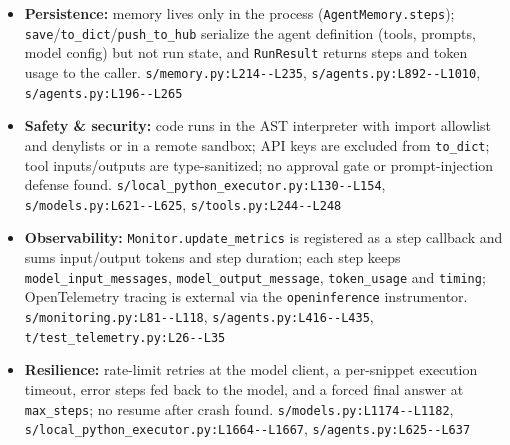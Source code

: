 \begin{itemize}
\item \textbf{Persistence:} memory lives only in the process (\texttt{AgentMemory.\allowbreak{}steps}); \texttt{save}/\texttt{to\_\allowbreak{}dict}/\texttt{push\_\allowbreak{}to\_\allowbreak{}hub} serialize the agent definition (tools, prompts, model config) but not run state, and \texttt{RunResult} returns steps and token usage to the caller. \texttt{s/\allowbreak{}memory.\allowbreak{}py:\allowbreak{}L214-\allowbreak{}-\allowbreak{}L235}, \texttt{s/\allowbreak{}agents.\allowbreak{}py:\allowbreak{}L892-\allowbreak{}-\allowbreak{}L1010}, \texttt{s/\allowbreak{}agents.\allowbreak{}py:\allowbreak{}L196-\allowbreak{}-\allowbreak{}L265}
\item \textbf{Safety \& security:} code runs in the AST interpreter with import allowlist and denylists or in a remote sandbox; API keys are excluded from \texttt{to\_\allowbreak{}dict}; tool inputs/outputs are type-sanitized; no approval gate or prompt-injection defense found. \texttt{s/\allowbreak{}local\_\allowbreak{}python\_\allowbreak{}executor.\allowbreak{}py:\allowbreak{}L130-\allowbreak{}-\allowbreak{}L154}, \texttt{s/\allowbreak{}models.\allowbreak{}py:\allowbreak{}L621-\allowbreak{}-\allowbreak{}L625}, \texttt{s/\allowbreak{}tools.\allowbreak{}py:\allowbreak{}L244-\allowbreak{}-\allowbreak{}L248}
\item \textbf{Observability:} \texttt{Monitor.\allowbreak{}update\_\allowbreak{}metrics} is registered as a step callback and sums input/output tokens and step duration; each step keeps \texttt{model\_\allowbreak{}input\_\allowbreak{}messages}, \texttt{model\_\allowbreak{}output\_\allowbreak{}message}, \texttt{token\_\allowbreak{}usage} and \texttt{timing}; OpenTelemetry tracing is external via the \texttt{openinference} instrumentor. \texttt{s/\allowbreak{}monitoring.\allowbreak{}py:\allowbreak{}L81-\allowbreak{}-\allowbreak{}L118}, \texttt{s/\allowbreak{}agents.\allowbreak{}py:\allowbreak{}L416-\allowbreak{}-\allowbreak{}L435}, \texttt{t/\allowbreak{}test\_\allowbreak{}telemetry.\allowbreak{}py:\allowbreak{}L26-\allowbreak{}-\allowbreak{}L35}
\item \textbf{Resilience:} rate-limit retries at the model client, a per-snippet execution timeout, error steps fed back to the model, and a forced final answer at \texttt{max\_\allowbreak{}steps}; no resume after crash found. \texttt{s/\allowbreak{}models.\allowbreak{}py:\allowbreak{}L1174-\allowbreak{}-\allowbreak{}L1182}, \texttt{s/\allowbreak{}local\_\allowbreak{}python\_\allowbreak{}executor.\allowbreak{}py:\allowbreak{}L1664-\allowbreak{}-\allowbreak{}L1667}, \texttt{s/\allowbreak{}agents.\allowbreak{}py:\allowbreak{}L625-\allowbreak{}-\allowbreak{}L637}

\end{itemize}
